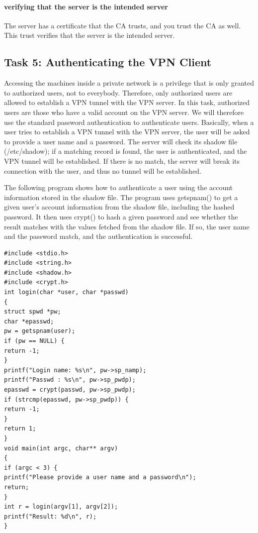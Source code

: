 \documentclass[12pt]{article}
\begin{document}
\paragraph{verifying that the server is the intended server}
The server has a certificate that the CA trusts, and you trust the CA as well. This trust verifies that the server is the intended server.

\subsection{Task 5: Authenticating the VPN Client}
Accessing the machines inside a private network is a privilege that is only granted to authorized users, not to everybody. Therefore, only authorized users are allowed to establish a VPN tunnel with the VPN server. In this task, authorized users are those who have a valid account on the VPN server. We will therefore use the standard password authentication to authenticate users. Basically, when a user tries to establish a VPN tunnel with the VPN server, the user will be asked to provide a user name and a password. The server will check its shadow file (/etc/shadow); if a matching record is found, the user is authenticated, and the VPN tunnel will be established. If there is no match, the server will break its connection with the user, and thus no tunnel will be established.

The following program shows how to authenticate a user using the account information stored in the shadow
file. The program uses getspnam() to get a given user’s account information from the shadow file,
including the hashed password. It then uses crypt() to hash a given password and see whether the result
matches with the values fetched from the shadow file. If so, the user name and the password match, and the
authentication is successful.

\begin{verbatim}
#include <stdio.h>
#include <string.h>
#include <shadow.h>
#include <crypt.h>
int login(char *user, char *passwd)
{
struct spwd *pw;
char *epasswd;
pw = getspnam(user);
if (pw == NULL) {
return -1;
}
printf("Login name: %s\n", pw->sp_namp);
printf("Passwd : %s\n", pw->sp_pwdp);
epasswd = crypt(passwd, pw->sp_pwdp);
if (strcmp(epasswd, pw->sp_pwdp)) {
return -1;
}
return 1;
}
void main(int argc, char** argv)
{
if (argc < 3) {
printf("Please provide a user name and a password\n");
return;
}
int r = login(argv[1], argv[2]);
printf("Result: %d\n", r);
}
\end{verbatim}
\end{document}
